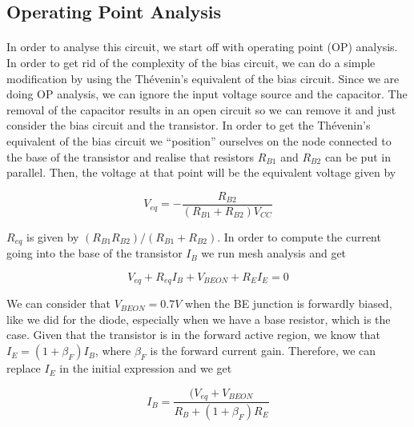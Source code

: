 \subsection{Operating Point Analysis}
\paragraph{} In order to analyse this circuit, we start off with operating point (OP) analysis. In order to get rid of the complexity of the bias circuit, we can do a simple modification by using the Thévenin's equivalent of the bias circuit. Since we are doing OP analysis, we can ignore the input voltage source and the capacitor. The removal of the capacitor results in an open circuit so we can remove it and just consider the bias circuit and the transistor. In order to get the Thévenin's equivalent of the bias circuit we “position” ourselves on the node connected to the base of the transistor and realise that resistors $R_{B1}$ and $R_{B2}$ can be put in parallel. Then, the voltage at that point will be the equivalent voltage given by

\begin{center}
    \begin{equation}
        V_{eq} = - \frac{R_{B2}}{(R_{B1} + R_{B2}) V_{CC}}
    \end{equation}
\end{center}


$R_{eq}$ is given by $(R_{B1} R_{B2} ) / (R_{B1} + R_{B2})$. In order to compute the current going into the base of the transistor $I_{B}$ we run mesh analysis and get

\begin{center}
    \begin{equation}
        V_{eq} + R_{eq} I_{B} + V_{BEON} + R_{E} I_{E} = 0
    \end{equation}
\end{center}

We can consider that $V_{BEON} = 0.7 V$ when the BE junction is forwardly biased, like we did for the diode, especially when we have a base resistor, which is the case. Given that the transistor is in the forward active region, we know that  $I_{E} = (1+ \beta_F) I_B$, where $\beta_F$ is the forward current gain. Therefore, we can replace $I_E$ in the initial expression and we get

\begin{center}
    \begin{equation}
        I_{B} = \frac{(V_{eq} + V_{BEON}}{R_B + (1+\beta_F) R_E}
    \end{equation}
\end{center}


